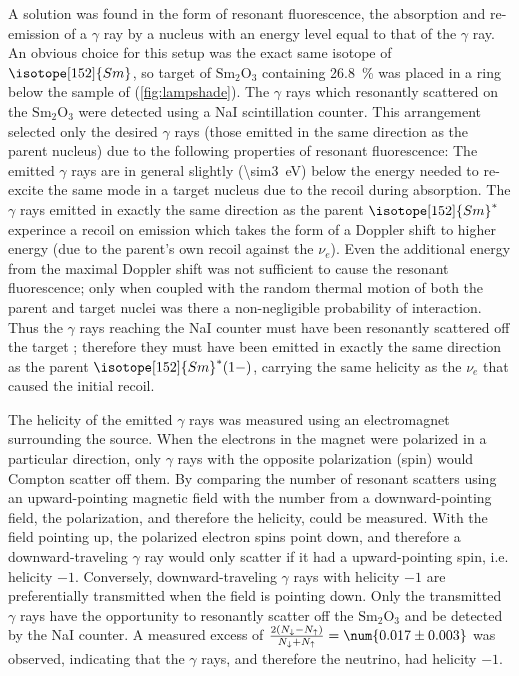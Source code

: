 A solution was found in the form of resonant fluorescence,
the absorption and re-emission of a $\gamma$ ray
by a nucleus with an energy level equal to that of the $\gamma$ ray.
An obvious choice for this setup was the exact same isotope of $\isotope[152]{Sm}$,
so target of $\text{Sm}_2\text{O}_3$
containing \SI{26.8}{\percent} 
was placed in a ring below the sample of 
(\cref{fig:lampshade}).
The $\gamma$ rays which resonantly scattered on the $\text{Sm}_2\text{O}_3$
were detected using a NaI scintillation counter.
This arrangement selected only the desired $\gamma$ rays
(those emitted in the same direction as the parent nucleus)
due to the following properties of resonant fluorescence:
The emitted $\gamma$ rays are in general
slightly (\SI{\sim3}{\eV}) below the energy
needed to re-excite the same mode in a target nucleus
due to the recoil during absorption.
The $\gamma$ rays emitted in exactly the same direction
as the parent $\isotope[152]{Sm}^*$
experince a recoil on emission which takes the form of
a Doppler shift to higher energy
(due to the parent's own recoil against the $\nu_e$).
Even the additional energy from the maximal Doppler shift
was not sufficient to cause the resonant fluorescence;
only when coupled with the random thermal motion
of both the parent and target nuclei
was there a non-negligible probability of interaction.
Thus the $\gamma$ rays reaching the NaI counter
must have been resonantly scattered off the target ;
therefore they must have been emitted in exactly the same direction
as the parent $\isotope[152]{Sm}^*(1-)$,
carrying the same helicity as the $\nu_e$
that caused the initial recoil.

The helicity of the emitted $\gamma$ rays was measured
using an electromagnet surrounding the  source.
When the electrons in the magnet were polarized in a particular direction,
only $\gamma$ rays with the opposite polarization (spin)
would Compton scatter off them.
By comparing the number of resonant scatters
using an upward-pointing magnetic field
with the number from a downward-pointing field,
the polarization, and therefore the helicity, could be measured.
With the field pointing up, the polarized electron spins point down,
and therefore a downward-traveling $\gamma$ ray
would only scatter if it had a upward-pointing spin, i.e. helicity $-1$.
Conversely, downward-traveling $\gamma$ rays
with helicity $-1$ are preferentially transmitted
when the field is pointing down.
Only the transmitted $\gamma$ rays have the opportunity to
resonantly scatter off the $\text{Sm}_2\text{O}_3$
and be detected by the NaI counter.
A measured excess of
$\frac{2(N_{\downarrow}-N_{\uparrow})}{N_{\downarrow}+N_{\uparrow}} =
\num{0.017\pm0.003}$
was observed,
indicating that the $\gamma$ rays, and therefore the neutrino,
had helicity $-1$.


